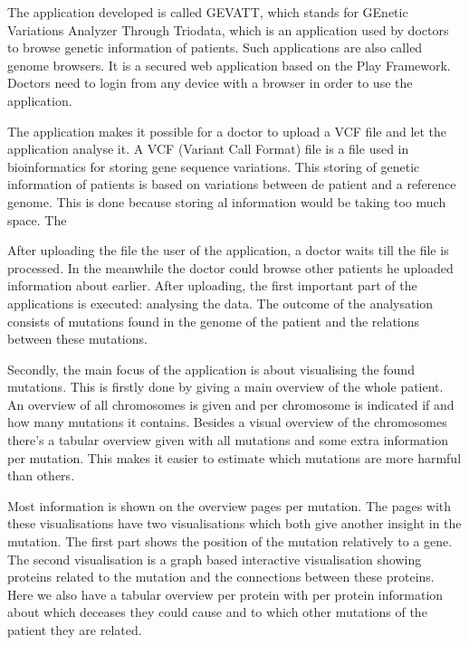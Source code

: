 The application developed is called GEVATT, which stands for GEnetic Variations Analyzer Through Triodata, which is an application used by doctors to browse genetic information of patients. Such applications are also called genome browsers. It is a secured web application based on the Play Framework. Doctors need to login from any device with a browser in order to use the application.

The application makes it possible for a doctor to upload a VCF file and let the application analyse it. A VCF (Variant Call Format) file is a file used in bioinformatics for storing gene sequence variations. This storing of genetic information of patients is based on variations between de patient and a reference genome. This is done because storing al information would be taking too much space. The 

After uploading the file the user of the application, a doctor waits till the file is processed. In the meanwhile the doctor could browse other patients he uploaded information about earlier. After uploading, the first important part of the applications is executed: analysing the data. The outcome of the analysation consists of mutations found in the genome of the patient and the relations between these mutations.

Secondly, the main focus of the application is about visualising the found mutations. This is firstly done by giving a main overview of the whole patient. An overview of all chromosomes is given and per chromosome is indicated if and how many mutations it contains. Besides a visual overview of the chromosomes there's a tabular overview given with all mutations and some extra information per mutation. This makes it easier to estimate which mutations are more harmful than others.

Most information is shown on the overview pages per mutation. The pages with these visualisations have two visualisations which both give another insight in the mutation. The first part shows the position of the mutation relatively to a gene. The second visualisation is a graph based interactive visualisation showing proteins related to the mutation and the connections between these proteins. Here we also have a tabular overview per protein with per protein information about which deceases they could cause and to which other mutations of the patient they are related.